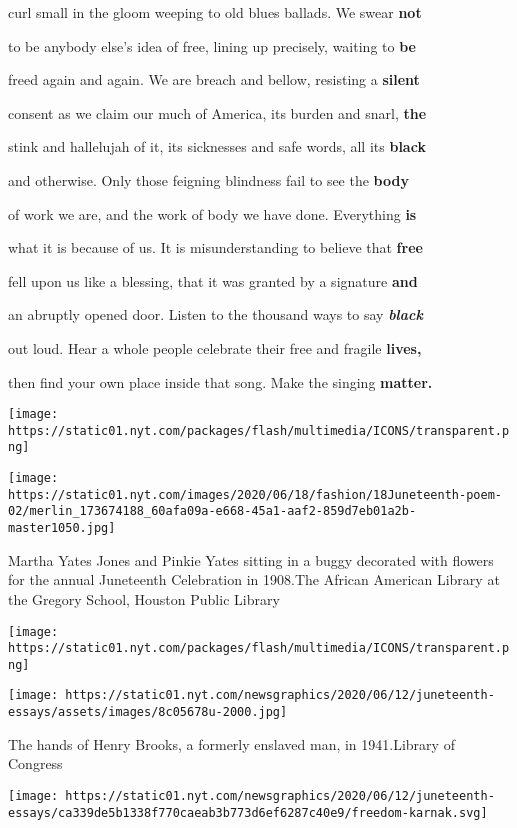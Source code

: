 curl small in the gloom weeping to old blues ballads. We swear
\textbf{not}

to be anybody else's idea of free, lining up precisely, waiting to
\textbf{be}

freed again and again. We are breach and bellow, resisting a
\textbf{silent}

consent as we claim our much of America, its burden and snarl,
\textbf{the}

stink and hallelujah of it, its sicknesses and safe words, all its
\textbf{black}

and otherwise. Only those feigning blindness fail to see the
\textbf{body}

of work we are, and the work of body we have done. Everything
\textbf{is}

what it is because of us. It is misunderstanding to believe that
\textbf{free}

fell upon us like a blessing, that it was granted by a signature
\textbf{and}

an abruptly opened door. Listen to the thousand ways to say
\emph{\textbf{black}}

out loud. Hear a whole people celebrate their free and fragile
\textbf{lives,}

then find your own place inside that song. Make the singing
\textbf{matter.}

\texttt{[image: https://static01.nyt.com/packages/flash/multimedia/ICONS/transparent.png]}

\texttt{[image: https://static01.nyt.com/images/2020/06/18/fashion/18Juneteenth-poem-02/merlin\_173674188\_60afa09a-e668-45a1-aaf2-859d7eb01a2b-master1050.jpg]}

Martha Yates Jones and Pinkie Yates sitting in a buggy decorated with
flowers for the annual Juneteenth Celebration in 1908.The African
American Library at the Gregory School, Houston Public Library

\texttt{[image: https://static01.nyt.com/packages/flash/multimedia/ICONS/transparent.png]}

\texttt{[image: https://static01.nyt.com/newsgraphics/2020/06/12/juneteenth-essays/assets/images/8c05678u-2000.jpg]}

The hands of Henry Brooks, a formerly enslaved man, in 1941.Library of
Congress

\href{https://www.nytimes.com/2020/06/18/style/aunt-jemima-black-cooking.html}{}

\texttt{[image: https://static01.nyt.com/newsgraphics/2020/06/12/juneteenth-essays/ca339de5b1338f770caeab3b773d6ef6287c40e9/freedom-karnak.svg]}

